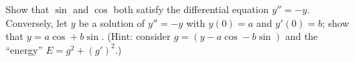 \begin{exercise}[$\star\star\star$]\label{exo:tle:trigo:9}
Show that $\sin$ and $\cos$ both satisfy the differential equation
$y'' = -y$. Conversely, let $y$ be a solution of $y'' = -y$ with
$y(0) = a$ and $y'(0) = b$; show that $y = a\cos + b\sin$.
(Hint: consider $g = (y - a\cos - b\sin)$ and the ``energy''
$E = g^2 + (g')^2$.)
\end{exercise}
